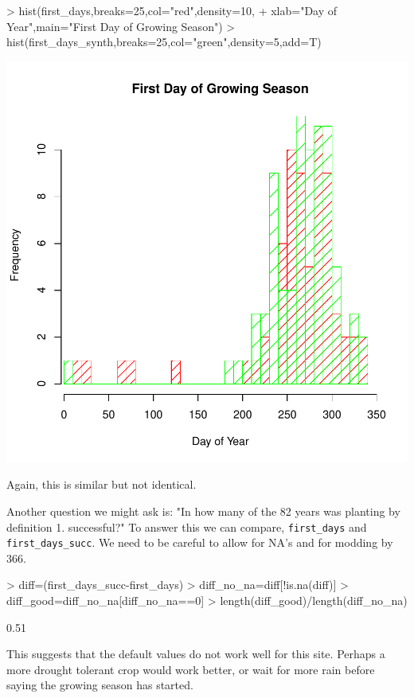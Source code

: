 \documentclass{article}
\begin{document}
\begin{Schunk}
\begin{Sinput}
> hist(first_days,breaks=25,col="red",density=10,
+      xlab="Day of Year",main="First Day of Growing Season")
> hist(first_days_synth,breaks=25,col="green",density=5,add=T)
\end{Sinput}
\end{Schunk}
\includegraphics{climate_vignette-028}

Again, this is similar but not identical.

Another question we might ask is:  "In how many of the 82 years
was planting by definition 1. successful?"
To answer this we can compare, {\tt first\_days}
and {\tt first\_days\_succ}.  We need to be careful to allow
for NA's and for modding by 366.

\begin{Schunk}
\begin{Sinput}
> diff=(first_days_succ-first_days) %
> diff_no_na=diff[!is.na(diff)]
> diff_good=diff_no_na[diff_no_na==0]
> length(diff_good)/length(diff_no_na)
\end{Sinput}
\begin{Soutput}
[1] 0.51
\end{Soutput}
\end{Schunk}

This suggests that the default values do not work
well for this site. Perhaps a more drought tolerant crop
would work better, or wait for more rain before saying
the growing season has started.
\end{document}
